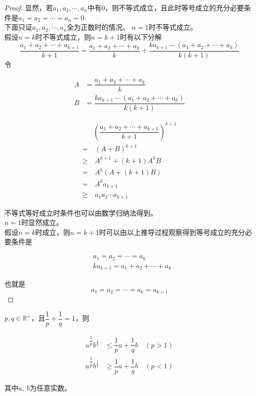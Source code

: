 \begin{proof}
    
    显然，若$a_1,a_2,\cdots,a_n$中有$0$，则不等式成立，且此时等号成立的充分必要条件是$a_1=a_2=\cdots=a_n=0$.\\
    下面只证$a_1,a_2,\cdots,a_n$全为正数时的情况。
    $n=1$时不等式成立。\\
    假设$n=k$时不等式成立，则$n=k+1$时有以下分解
    $$\dfrac{a_1+a_2+\cdots+a_{k+1}}{k+1} = \dfrac{a_1+a_2+\cdots+a_{k}}{k}+ \dfrac{ka_{k+1}-(a_1+a_2+\cdots+a_k)}{k(k+1)}$$
    令
    
    \begin{align*}
        A&=\dfrac{a_1+a_2+\cdots+a_{k}}{k}\\
        B&=\dfrac{ka_{k+1}-(a_1+a_2+\cdots+a_k)}{k(k+1)}
    \end{align*}

    \begin{align*}
        & \left(\dfrac{a_1+a_2+\cdots+a_{k+1}}{k+1}\right)^{k+1} \\
        = & \  (A+B)^{k+1}\\
        \geq & \  A^{k+1} + (k+1) A^k B\\
        = & \ A^k(A+(k+1)B)\\
        = & \ A^k a_{k+1}\\
        \geq & \ a_1 a_2 \cdots a_{k+1}
    \end{align*}

    不等式等好成立时条件也可以由数学归纳法得到。\\
    $n=1$时显然成立。\\
    假设$n=k$时成立，则$n=k+1$时可以由以上推导过程观察得到等号成立的充分必要条件是

    \begin{align*}
        & a_1 = a_2 = \cdots = a_k \\
        & ka_{k + 1} = a_1 + a_2 + \cdots + a_k
    \end{align*}

    也就是
    $$a_1 = a_2 = \cdots = a_k = a_{k + 1}$$
\end{proof}

\begin{theorem}[Young不等式]

    $p,q\in\mathbb{R}^+$，且$\dfrac{1}{p}+\dfrac{1}{q}=1$，则

    \begin{align*}
        a^{\dfrac{1}{p}} b^{\frac{1}{q}} & \leq \dfrac{1}{p}a + \dfrac{1}{q}b \quad (p > 1)\\
        a^{\dfrac{1}{p}} b^{\frac{1}{q}} & \geq \dfrac{1}{p}a + \dfrac{1}{q}b \quad (p < 1)
    \end{align*}

    其中$a,\ b$为任意实数。

\end{theorem}

